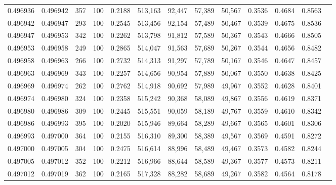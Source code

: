 \begin{tabular}{rrrrrrrrrrrrr}
0.496936 & 0.496942 &   357 & 100 &                                     0.2188 & 513,163 &  92,447 &  57,389 &  50,567 & 0.3536 & 0.4684 & 0.8563 \\
0.496942 & 0.496947 &   293 & 100 &                                     0.2545 & 513,456 &  92,154 &  57,489 &  50,467 & 0.3539 & 0.4675 & 0.8536 \\
0.496947 & 0.496953 &   342 & 100 &                                     0.2262 & 513,798 &  91,812 &  57,589 &  50,367 & 0.3543 & 0.4666 & 0.8505 \\
0.496953 & 0.496958 &   249 & 100 &                                     0.2865 & 514,047 &  91,563 &  57,689 &  50,267 & 0.3544 & 0.4656 & 0.8482 \\
0.496958 & 0.496963 &   266 & 100 &                                     0.2732 & 514,313 &  91,297 &  57,789 &  50,167 & 0.3546 & 0.4647 & 0.8457 \\
0.496963 & 0.496969 &   343 & 100 &                                     0.2257 & 514,656 &  90,954 &  57,889 &  50,067 & 0.3550 & 0.4638 & 0.8425 \\
0.496969 & 0.496974 &   262 & 100 &                                     0.2762 & 514,918 &  90,692 &  57,989 &  49,967 & 0.3552 & 0.4628 & 0.8401 \\
0.496974 & 0.496980 &   324 & 100 &                                     0.2358 & 515,242 &  90,368 &  58,089 &  49,867 & 0.3556 & 0.4619 & 0.8371 \\
0.496980 & 0.496986 &   309 & 100 &                                     0.2445 & 515,551 &  90,059 &  58,189 &  49,767 & 0.3559 & 0.4610 & 0.8342 \\
0.496986 & 0.496993 &   395 & 100 &                                     0.2020 & 515,946 &  89,664 &  58,289 &  49,667 & 0.3565 & 0.4601 & 0.8306 \\
0.496993 & 0.497000 &   364 & 100 &                                     0.2155 & 516,310 &  89,300 &  58,389 &  49,567 & 0.3569 & 0.4591 & 0.8272 \\
0.497000 & 0.497005 &   304 & 100 &                                     0.2475 & 516,614 &  88,996 &  58,489 &  49,467 & 0.3573 & 0.4582 & 0.8244 \\
0.497005 & 0.497012 &   352 & 100 &                                     0.2212 & 516,966 &  88,644 &  58,589 &  49,367 & 0.3577 & 0.4573 & 0.8211 \\
0.497012 & 0.497019 &   362 & 100 &                                     0.2165 & 517,328 &  88,282 &  58,689 &  49,267 & 0.3582 & 0.4564 & 0.8178 \\

\end{tabular}
